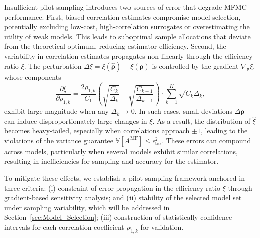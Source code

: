 Insufficient pilot sampling introduces two sources of error that degrade MFMC performance. First, biased correlation estimates compromise model selection, potentially excluding low-cost, high-correlation surrogates or overestimating the utility of weak models. This leads to suboptimal sample allocations that deviate from the theoretical optimum, reducing estimator efficiency. Second, the variability in correlation estimates propagates non-linearly through the efficiency ratio $\xi$. The perturbation $\Delta\xi = \xi(\widehat{\boldsymbol{\rho}}) - \xi(\boldsymbol{\rho})$ is controlled by the gradient $\nabla_{\boldsymbol{\rho}} \xi$, whose components
%
\[
\frac{\partial \xi}{\partial \rho_{1,k}} = \frac{2\rho_{1,k}}{C_1}\left(\sqrt{\frac{C_k}{\Delta_k }} - \sqrt{\frac{C_{k-1}}{\Delta_{k-1} }}\right)\cdot \sum_{k=1}^K\sqrt{C_k\Delta_k },
\]
%
exhibit large magnitude when any $\Delta_k \to 0$. In such cases, small deviations $\Delta \boldsymbol{\rho}$ can induce disproportionately large changes in $\xi$. As a result, the distribution of $\widehat{\xi}$ becomes heavy-tailed, especially when correlations approach $\pm 1$, leading to the violations of the variance guarantee $\mathbb{V}[A^{\mathrm{MF}}] \leq \epsilon_{\mathrm{tar}}^2$. These errors can compound across models, particularly when several models exhibit similar correlations, resulting in inefficiencies for sampling and accuracy for the estimator.




To mitigate these effects, we establish a pilot sampling framework anchored in three criteria: (i) constraint of error propagation in the efficiency ratio $\xi$ through gradient-based sensitivity analysis; and (ii) stability of the selected model set under sampling variability, which will be addressed in Section~\ref{sec:Model_Selection}; (iii) construction of statistically confidence intervals for each correlation coefficient $\rho_{1,k}$ for validation.


